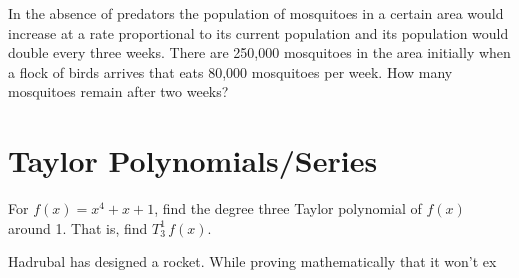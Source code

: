 \documentclass[paper=letter, 11pt]{article}
\begin{document}
\Prob In the absence of predators the population of mosquitoes in a certain area would increase
at a rate proportional to its current population and its population would double every
three weeks. There are 250,000 mosquitoes in the area initially when a flock of birds
arrives that eats 80,000 mosquitoes per week. How many mosquitoes remain after two
weeks?

\section*{Taylor Polynomials/Series}

\Prob For $f(x) = x^4 + x + 1$, find the degree three Taylor polynomial of $f(x)$ around 1.  That is, find $T^1_3\,f(x)$.\vfill

\Prob Hadrubal has designed a rocket.  While proving mathematically that it won't ex
\end{document}
